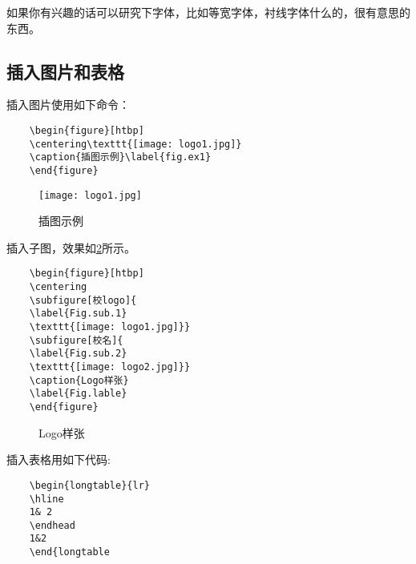 如果你有兴趣的话可以研究下字体，比如等宽字体，衬线字体什么的，很有意思的东西。

\subsection{插入图片和表格}
插入图片使用如下命令：
\begin{spacing}{1.0}
	\begin{verbatim}
	\begin{figure}[htbp]
	\centering\texttt{[image: logo1.jpg]}
	\caption{插图示例}\label{fig.ex1}
	\end{figure}
	\end{verbatim}
\end{spacing}
\begin{figure}[htbp]
	\centering\texttt{[image: logo1.jpg]}
	\caption{插图示例}\label{fig.ex1}
\end{figure}

插入子图，效果如\cref{fig.ex2}所示。
\begin{spacing}{1.0}
	\begin{verbatim}
	\begin{figure}[htbp]
	\centering
	\subfigure[校logo]{
	\label{Fig.sub.1}
	\texttt{[image: logo1.jpg]}}
	\subfigure[校名]{
	\label{Fig.sub.2}
	\texttt{[image: logo2.jpg]}}
	\caption{Logo样张}
	\label{Fig.lable}
	\end{figure}
	\end{verbatim}
\end{spacing}
\begin{figure}[htbp]
	\centering
	\caption{Logo样张}
	\label{fig.ex2}
\end{figure}
插入表格用如下代码:
\begin{spacing}{1.0}
	\begin{verbatim}
	\begin{longtable}{lr}
	\hline
	1& 2
	\endhead
	1&2
	\end{longtable
	\end{verbatim}
\end{spacing}



